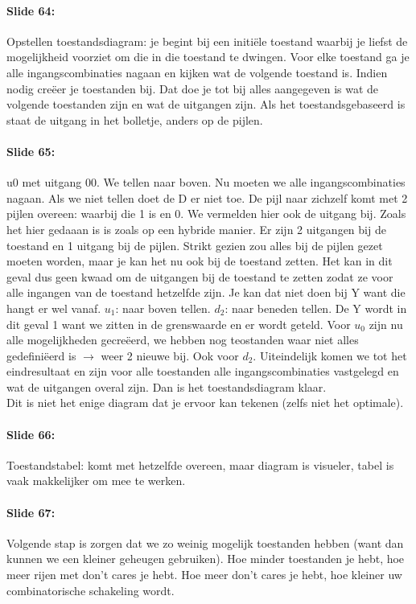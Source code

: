 \documentclass[10pt,a4paper]{book}
\begin{document}
\paragraph{Slide 64:} Opstellen toestandsdiagram: je begint bij een initi\"ele toestand waarbij je liefst de mogelijkheid voorziet om die in die toestand te dwingen. Voor elke toestand ga je alle ingangscombinaties nagaan en kijken wat de volgende toestand is. Indien nodig cre\"eer je toestanden bij. Dat doe je tot bij alles aangegeven is wat de volgende toestanden zijn en wat de uitgangen zijn. Als het toestandsgebaseerd is staat de uitgang in het bolletje, anders op de pijlen.

\paragraph{Slide 65:} u0 met uitgang 00. We tellen naar boven. Nu moeten we alle ingangscombinaties nagaan. Als we niet tellen doet de D er niet toe. De pijl naar zichzelf komt met 2 pijlen overeen: waarbij die 1 is en 0. We vermelden hier ook de uitgang bij. Zoals het hier gedaaan is is zoals op een hybride manier. Er zijn 2 uitgangen bij de toestand en 1 uitgang bij de pijlen. Strikt gezien zou alles bij de pijlen gezet moeten worden, maar je kan het nu ook bij de toestand zetten. Het kan in dit geval dus geen kwaad om de uitgangen bij de toestand te zetten zodat ze voor alle ingangen van de toestand hetzelfde zijn. Je kan dat niet doen bij Y want die hangt er wel vanaf. $u_1$: naar boven tellen. $d_2$: naar beneden tellen. De Y wordt in dit geval 1 want we zitten in de grenswaarde en er wordt geteld. Voor $u_0$ zijn nu alle mogelijkheden gecre\"eerd, we hebben nog teostanden waar niet alles gedefini\"eerd is $\rightarrow$ weer 2 nieuwe bij. Ook voor $d_2$. Uiteindelijk komen we tot het eindresultaat en zijn voor alle toestanden alle ingangscombinaties vastgelegd en wat de uitgangen overal zijn. Dan is het toestandsdiagram klaar.\\
Dit is niet het enige diagram dat je ervoor kan tekenen (zelfs niet het optimale). 

\paragraph{Slide 66:} Toestandstabel: komt met hetzelfde overeen, maar diagram is visueler, tabel is vaak makkelijker om mee te werken. 

\paragraph{Slide 67:} Volgende stap is zorgen dat we zo weinig mogelijk toestanden hebben (want dan kunnen we een kleiner geheugen gebruiken). Hoe minder toestanden je hebt, hoe meer rijen met don't cares je hebt. Hoe meer don't cares je hebt, hoe kleiner uw combinatorische schakeling wordt. 
\end{document}
